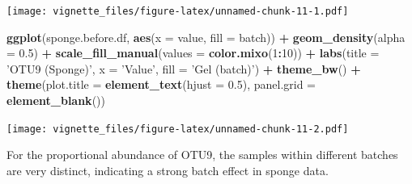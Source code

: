 \documentclass[]{book}
\newenvironment{Shaded}{\begin{snugshade}}{\end{snugshade}}
\newcommand{\KeywordTok}[1]{\textcolor[rgb]{0.13,0.29,0.53}{\textbf{#1}}}
\newcommand{\DataTypeTok}[1]{\textcolor[rgb]{0.13,0.29,0.53}{#1}}
\newcommand{\DecValTok}[1]{\textcolor[rgb]{0.00,0.00,0.81}{#1}}
\newcommand{\FloatTok}[1]{\textcolor[rgb]{0.00,0.00,0.81}{#1}}
\newcommand{\StringTok}[1]{\textcolor[rgb]{0.31,0.60,0.02}{#1}}
\newcommand{\CommentTok}[1]{\textcolor[rgb]{0.56,0.35,0.01}{\textit{#1}}}
\newcommand{\OperatorTok}[1]{\textcolor[rgb]{0.81,0.36,0.00}{\textbf{#1}}}
\newcommand{\NormalTok}[1]{#1}
\begin{document}
\begin{Shaded}
\end{Shaded}

\texttt{[image: vignette\_files/figure-latex/unnamed-chunk-11-1.pdf]}

\begin{Shaded}
\begin{Highlighting}[]
\KeywordTok{ggplot}\NormalTok{(sponge.before.df, }\KeywordTok{aes}\NormalTok{(}\DataTypeTok{x =}\NormalTok{ value, }\DataTypeTok{fill =}\NormalTok{ batch)) }\OperatorTok{+}\StringTok{ }
\StringTok{  }\KeywordTok{geom_density}\NormalTok{(}\DataTypeTok{alpha =} \FloatTok{0.5}\NormalTok{) }\OperatorTok{+}\StringTok{ }\KeywordTok{scale_fill_manual}\NormalTok{(}\DataTypeTok{values =} \KeywordTok{color.mixo}\NormalTok{(}\DecValTok{1}\OperatorTok{:}\DecValTok{10}\NormalTok{)) }\OperatorTok{+}\StringTok{ }
\StringTok{  }\KeywordTok{labs}\NormalTok{(}\DataTypeTok{title =} \StringTok{'OTU9 (Sponge)'}\NormalTok{, }\DataTypeTok{x =} \StringTok{'Value'}\NormalTok{, }\DataTypeTok{fill =} \StringTok{'Gel (batch)'}\NormalTok{) }\OperatorTok{+}\StringTok{ }
\StringTok{  }\KeywordTok{theme_bw}\NormalTok{() }\OperatorTok{+}\StringTok{ }\KeywordTok{theme}\NormalTok{(}\DataTypeTok{plot.title =} \KeywordTok{element_text}\NormalTok{(}\DataTypeTok{hjust =} \FloatTok{0.5}\NormalTok{), }
                     \DataTypeTok{panel.grid =} \KeywordTok{element_blank}\NormalTok{())}
\end{Highlighting}
\end{Shaded}

\texttt{[image: vignette\_files/figure-latex/unnamed-chunk-11-2.pdf]}

For the proportional abundance of OTU9, the samples within different
batches are very distinct, indicating a strong batch effect in sponge
data.
\end{document}
